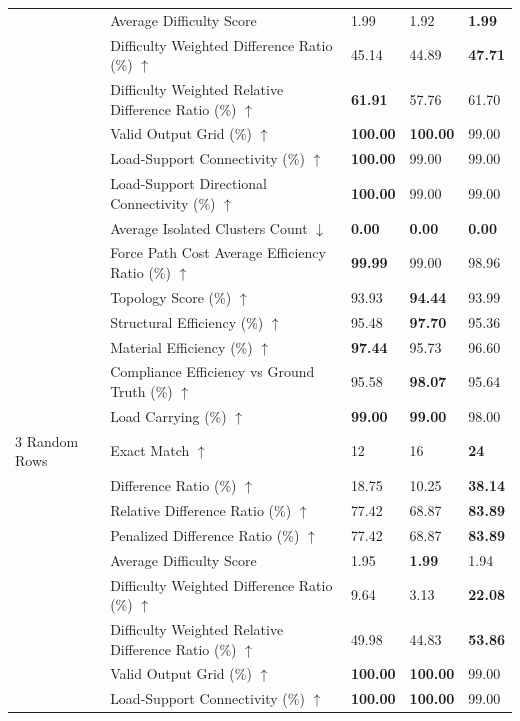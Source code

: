 \begin{table}[!h]
{\begin{tabular}{lllll}
 & Average Difficulty Score & 1.99 & 1.92 & \textbf{1.99} \\
 & Difficulty Weighted Difference Ratio (\%) $\uparrow$ & 45.14 & 44.89 & \textbf{47.71} \\
 & Difficulty Weighted Relative Difference Ratio (\%) $\uparrow$ & \textbf{61.91} & 57.76 & 61.70 \\
 & Valid Output Grid (\%) $\uparrow$ & \textbf{100.00} & \textbf{100.00} & 99.00 \\
 & Load-Support Connectivity (\%) $\uparrow$ & \textbf{100.00} & 99.00 & 99.00 \\
 & Load-Support Directional Connectivity (\%) $\uparrow$ & \textbf{100.00} & 99.00 & 99.00 \\
 & Average Isolated Clusters Count $\downarrow$ & \textbf{0.00} & \textbf{0.00} & \textbf{0.00} \\
 & Force Path Cost Average Efficiency Ratio (\%) $\uparrow$ & \textbf{99.99} & 99.00 & 98.96 \\
 & Topology Score (\%) $\uparrow$ & 93.93 & \textbf{94.44} & 93.99 \\
 & Structural Efficiency (\%) $\uparrow$ & 95.48 & \textbf{97.70} & 95.36 \\
 & Material Efficiency (\%) $\uparrow$ & \textbf{97.44} & 95.73 & 96.60 \\
 & Compliance Efficiency vs Ground Truth (\%) $\uparrow$ & 95.58 & \textbf{98.07} & 95.64 \\
 & Load Carrying (\%) $\uparrow$ & \textbf{99.00} & \textbf{99.00} & 98.00 \\
3 Random Rows & Exact Match $\uparrow$ & 12 & 16 & \textbf{24} \\
 & Difference Ratio (\%) $\uparrow$ & 18.75 & 10.25 & \textbf{38.14} \\
 & Relative Difference Ratio (\%) $\uparrow$ & 77.42 & 68.87 & \textbf{83.89} \\
 & Penalized Difference Ratio (\%) $\uparrow$ & 77.42 & 68.87 & \textbf{83.89} \\
 & Average Difficulty Score & 1.95 & \textbf{1.99} & 1.94 \\
 & Difficulty Weighted Difference Ratio (\%) $\uparrow$ & 9.64 & 3.13 & \textbf{22.08} \\
 & Difficulty Weighted Relative Difference Ratio (\%) $\uparrow$ & 49.98 & 44.83 & \textbf{53.86} \\
 & Valid Output Grid (\%) $\uparrow$ & \textbf{100.00} & \textbf{100.00} & 99.00 \\
 & Load-Support Connectivity (\%) $\uparrow$ & \textbf{100.00} & \textbf{100.00} & 99.00 \\

\end{tabular}}
\end{table}
